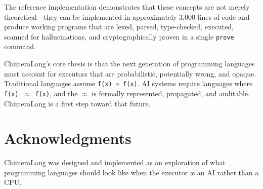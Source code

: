 \documentclass[11pt,a4paper]{article}
\begin{document}
The reference implementation demonstrates that these concepts are not merely
theoretical---they can be implemented in approximately 3{,}000 lines of code
and produce working programs that are lexed, parsed, type-checked, executed,
scanned for hallucinations, and cryptographically proven in a single
\texttt{prove} command.

ChimeraLang's core thesis is that the next generation of programming languages
must account for executors that are probabilistic, potentially wrong, and
opaque. Traditional languages assume \texttt{f(x) = f(x)}. AI systems require
languages where \texttt{f(x) $\approx$ f(x)}, and the $\approx$ is formally
represented, propagated, and auditable. ChimeraLang is a first step toward
that future.

\section*{Acknowledgments}

ChimeraLang was designed and implemented as an exploration of what programming
languages should look like when the executor is an AI rather than a CPU.


\end{document}
